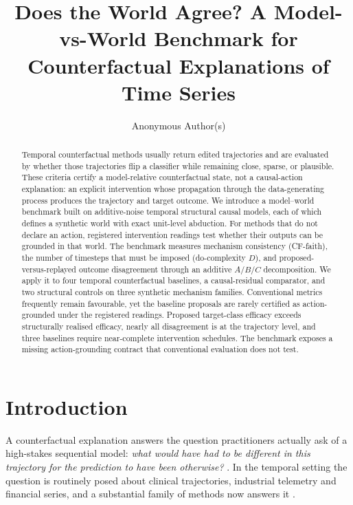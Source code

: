 \documentclass{article}
\title{Does the World Agree? A Model-vs-World Benchmark for Counterfactual Explanations of Time Series}
\author{%
  Anonymous Author(s)
}
\begin{document}
\maketitle

\begin{abstract}
Temporal counterfactual methods usually return edited trajectories and are evaluated by whether those trajectories flip a classifier while remaining close, sparse, or plausible.  These criteria certify a model-relative counterfactual state, not a causal-action explanation: an explicit intervention whose propagation through the data-generating process produces the trajectory and target outcome.  We introduce a model--world benchmark built on additive-noise temporal structural causal models, each of which defines a synthetic world with exact unit-level abduction.  For methods that do not declare an action, registered intervention readings test whether their outputs can be grounded in that world.  The benchmark measures mechanism consistency (CF-faith), the number of timesteps that must be imposed (do-complexity $D$), and proposed-versus-replayed outcome disagreement through an additive $A/B/C$ decomposition.  We apply it to four temporal counterfactual baselines, a causal-residual comparator, and two structural controls on three synthetic mechanism families.  Conventional metrics frequently remain favourable, yet the baseline proposals are rarely certified as action-grounded under the registered readings.  Proposed target-class efficacy exceeds structurally realised efficacy, nearly all disagreement is at the trajectory level, and three baselines require near-complete intervention schedules.  The benchmark exposes a missing action-grounding contract that conventional evaluation does not test.
\end{abstract}

\section{Introduction}

A counterfactual explanation answers the question practitioners actually ask of a high-stakes sequential model: \emph{what would have had to be different in this trajectory for the prediction to have been otherwise?} \citep{wachter2017counterfactual}. In the temporal setting the question is routinely posed about clinical trajectories, industrial telemetry and financial series, and a substantial family of methods now answers it \citep{delaney2021nativeguide,ates2021comte,hollig2022tsevo,li2024mcels,paredescetina2025confetti,yan2023counts}.
\end{document}
